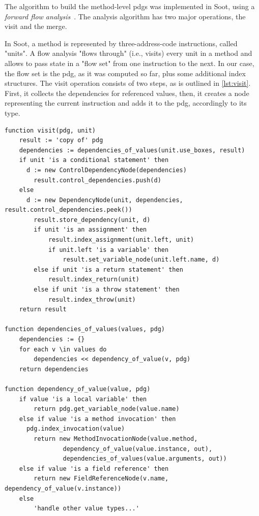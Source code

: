 The algorithm to build the method-level \acp{pdg} was implemented in Soot, using a \emph{forward flow analysis}~\cite{lam_11_the_soot_framework}.
The analysis algorithm has two major operations, the visit and the merge.

In Soot, a method is represented by three-address-code instructions, called "units".
A flow analysis "flows through" (i.e., visits) every unit in a method and allows to pass state in a "flow set" from one instruction to the next.
In our case, the flow set is the \ac{pdg}, as it was computed so far, plus some additional index structures.
The visit operation consists of two steps, as is outlined in \cref{lst:visit}.
First, it collects the dependencies for referenced values, 
then, it creates a node representing the current instruction and adds it to the \ac{pdg}, accordingly to its type.

\begin{lstlisting}[firstnumber=1,float,caption={The algorithm of the visit operation.},stepnumber=5,label=lst:visit,gobble=0,language=algorithm,tabsize=2]
function visit(pdg, unit)
	result := 'copy of' pdg
	dependencies := dependencies_of_values(unit.use_boxes, result)
	if unit 'is a conditional statement' then
	  d := new ControlDependencyNode(dependencies)
		result.control_dependencies.push(d)
	else
	  d := new DependencyNode(unit, dependencies, result.control_dependencies.peek())
		result.store_dependency(unit, d)
		if unit 'is an assignment' then
			result.index_assignment(unit.left, unit)
			if unit.left 'is a variable' then
				result.set_variable_node(unit.left.name, d)
		else if unit 'is a return statement' then
			result.index_return(unit)
		else if unit 'is a throw statement' then
			result.index_throw(unit)
	return result

function dependencies_of_values(values, pdg)
	dependencies := {}
	for each v \in values do
		dependencies << dependency_of_value(v, pdg)
	return dependencies

function dependency_of_value(value, pdg)
	if value 'is a local variable' then
		return pdg.get_variable_node(value.name)
	else if value 'is a method invocation' then
	  pdg.index_invocation(value)
		return new MethodInvocationNode(value.method, 
				dependency_of_value(value.instance, out), 
				dependencies_of_values(value.arguments, out))
	else if value 'is a field reference' then
		return new FieldReferenceNode(v.name, dependency_of_value(v.instance))
	else 
		'handle other value types...'
\end{lstlisting}

